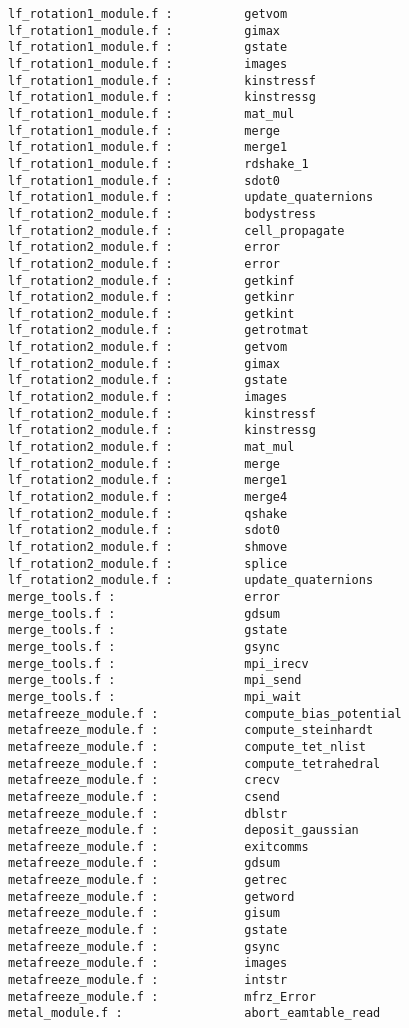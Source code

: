 \begin{verbatim}
lf_rotation1_module.f :          getvom 
lf_rotation1_module.f :          gimax 
lf_rotation1_module.f :          gstate 
lf_rotation1_module.f :          images 
lf_rotation1_module.f :          kinstressf 
lf_rotation1_module.f :          kinstressg 
lf_rotation1_module.f :          mat_mul 
lf_rotation1_module.f :          merge 
lf_rotation1_module.f :          merge1 
lf_rotation1_module.f :          rdshake_1 
lf_rotation1_module.f :          sdot0
lf_rotation1_module.f :          update_quaternions 
lf_rotation2_module.f :          bodystress 
lf_rotation2_module.f :          cell_propagate 
lf_rotation2_module.f :          error 
lf_rotation2_module.f :          error 
lf_rotation2_module.f :          getkinf
lf_rotation2_module.f :          getkinr
lf_rotation2_module.f :          getkint
lf_rotation2_module.f :          getrotmat 
lf_rotation2_module.f :          getvom 
lf_rotation2_module.f :          gimax 
lf_rotation2_module.f :          gstate 
lf_rotation2_module.f :          images 
lf_rotation2_module.f :          kinstressf 
lf_rotation2_module.f :          kinstressg 
lf_rotation2_module.f :          mat_mul 
lf_rotation2_module.f :          merge 
lf_rotation2_module.f :          merge1 
lf_rotation2_module.f :          merge4 
lf_rotation2_module.f :          qshake 
lf_rotation2_module.f :          sdot0
lf_rotation2_module.f :          shmove 
lf_rotation2_module.f :          splice 
lf_rotation2_module.f :          update_quaternions 
merge_tools.f :                  error 
merge_tools.f :                  gdsum 
merge_tools.f :                  gstate 
merge_tools.f :                  gsync 
merge_tools.f :                  mpi_irecv 
merge_tools.f :                  mpi_send 
merge_tools.f :                  mpi_wait 
metafreeze_module.f :            compute_bias_potential 
metafreeze_module.f :            compute_steinhardt 
metafreeze_module.f :            compute_tet_nlist 
metafreeze_module.f :            compute_tetrahedral 
metafreeze_module.f :            crecv 
metafreeze_module.f :            csend 
metafreeze_module.f :            dblstr
metafreeze_module.f :            deposit_gaussian 
metafreeze_module.f :            exitcomms 
metafreeze_module.f :            gdsum 
metafreeze_module.f :            getrec 
metafreeze_module.f :            getword 
metafreeze_module.f :            gisum 
metafreeze_module.f :            gstate 
metafreeze_module.f :            gsync 
metafreeze_module.f :            images 
metafreeze_module.f :            intstr
metafreeze_module.f :            mfrz_Error 
metal_module.f :                 abort_eamtable_read 

\end{verbatim}
